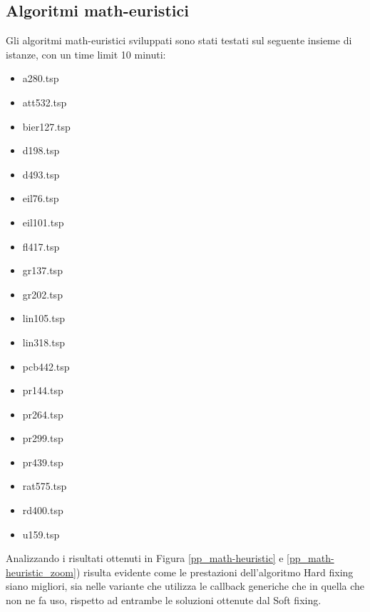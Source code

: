 \subsection{Algoritmi math-euristici}
Gli algoritmi math-euristici sviluppati sono stati testati sul seguente insieme di istanze, con un time limit 10 minuti:
\begin{center}
\begin{multicols}{3}
\begin{itemize}
\item{a280.tsp}  
\item{att532.tsp} 
\item{bier127.tsp}
\item{d198.tsp}   
\item{d493.tsp}   
\item{eil76.tsp}  
\item{eil101.tsp} 
\item{fl417.tsp}  
\item{gr137.tsp}  
\item{gr202.tsp}  
\item{lin105.tsp} 
\item{lin318.tsp} 
\item{pcb442.tsp} 
\item{pr144.tsp}  
\item{pr264.tsp}  
\item{pr299.tsp}  
\item{pr439.tsp}  
\item{rat575.tsp} 
\item{rd400.tsp}  
\item{u159.tsp}
\end{itemize}
\end{multicols}
\end{center}
Analizzando i risultati ottenuti in Figura \ref{pp_math-heuristic} e \ref{pp_math-heuristic_zoom}) risulta evidente come le prestazioni dell'algoritmo Hard fixing siano migliori, sia nelle variante che utilizza le callback generiche che in quella che non ne fa uso, rispetto ad entrambe le soluzioni ottenute dal Soft fixing.
